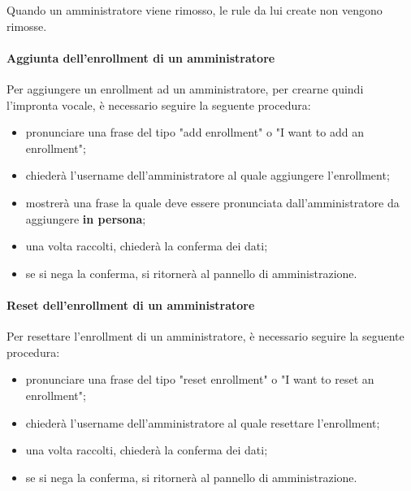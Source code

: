 Quando un amministratore viene rimosso, le rule da lui create non vengono rimosse.
\paragraph{Aggiunta dell'enrollment di un amministratore}\label{addEnrollment}

Per aggiungere un enrollment ad un amministratore, per crearne quindi l'impronta vocale, è necessario seguire la seguente procedura:
\begin{itemize}
	\item pronunciare una frase del tipo "add enrollment" o "I want to add an enrollment";
	\item \PROGETTO{} chiederà l'username dell'amministratore al quale aggiungere l'enrollment;
	\item \PROGETTO{} mostrerà una frase la quale deve essere pronunciata dall'amministratore da aggiungere \textbf{in persona}; 
	\item una volta raccolti, \PROGETTO{} chiederà la conferma dei dati;
	\item se si nega la conferma, si ritornerà al pannello di amministrazione.
\end{itemize}
\paragraph{Reset dell'enrollment di un amministratore}

Per resettare l'enrollment di un amministratore, è necessario seguire la seguente procedura:
\begin{itemize}
	\item pronunciare una frase del tipo "reset enrollment" o "I want to reset an enrollment";
	\item \PROGETTO{} chiederà l'username dell'amministratore al quale resettare l'enrollment;
	\item una volta raccolti, \PROGETTO{} chiederà la conferma dei dati;
	\item se si nega la conferma, si ritornerà al pannello di amministrazione.
\end{itemize}